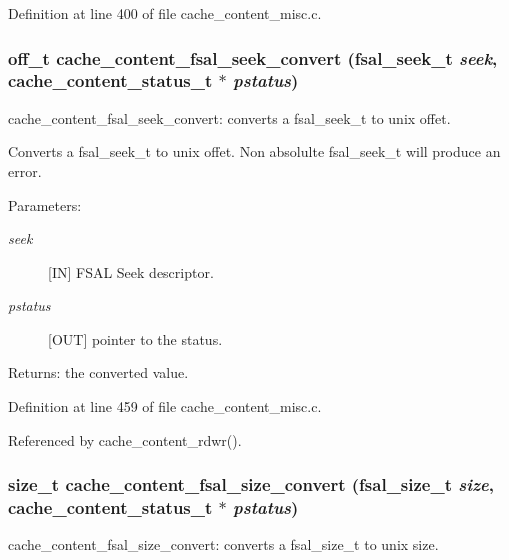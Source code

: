 Definition at line 400 of file cache\_\-content\_\-misc.c.
\subsubsection{\setlength{\rightskip}{0pt plus 5cm}off\_\-t cache\_\-content\_\-fsal\_\-seek\_\-convert (fsal\_\-seek\_\-t {\em seek}, cache\_\-content\_\-status\_\-t $\ast$ {\em pstatus})}\label{cache__content__misc_8c_a11}


cache\_\-content\_\-fsal\_\-seek\_\-convert: converts a fsal\_\-seek\_\-t to unix offet.

Converts a fsal\_\-seek\_\-t to unix offet. Non absolulte fsal\_\-seek\_\-t will produce an error.

\begin{Desc}
\item[Parameters:]
\begin{description}
\item[{\em seek}][IN] FSAL Seek descriptor. \item[{\em pstatus}][OUT] pointer to the status.\end{description}
\end{Desc}
\begin{Desc}
\item[Returns:]the converted value. \end{Desc}


Definition at line 459 of file cache\_\-content\_\-misc.c.

Referenced by cache\_\-content\_\-rdwr().
\subsubsection{\setlength{\rightskip}{0pt plus 5cm}size\_\-t cache\_\-content\_\-fsal\_\-size\_\-convert (fsal\_\-size\_\-t {\em size}, cache\_\-content\_\-status\_\-t $\ast$ {\em pstatus})}\label{cache__content__misc_8c_a12}


cache\_\-content\_\-fsal\_\-size\_\-convert: converts a fsal\_\-size\_\-t to unix size.

